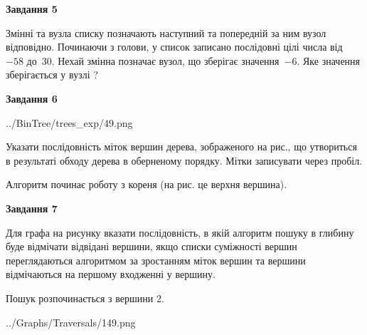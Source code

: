 \documentclass[12pt, ukrainian]{article}
\begin{document}
{\begin {large}
{\begin {center}\textbf{Завдання 5}\end {center}}\par
Змінні  та  вузла списку позначають наступний та попередній за ним вузол відповідно. Починаючи з голови, у список записано послідовні цілі числа від~$-58$ до~$30$. Нехай змінна  позначає вузол, що зберігає значення~$-6$.
Яке значення зберігається у вузлі  ?\par
\newpage

{\begin {center}\textbf{Завдання 6}\end {center}}\par

\begin{center}
	{../BinTree/trees_exp/49.png}
\end{center}
Указати послідовність міток вершин дерева, зображеного на рис., що утвориться в результаті обходу дерева в оберненому порядку. Мітки записувати через пробіл.\par Алгоритм починає роботу з кореня (на рис. це верхня вершина).\par
\newpage

{\begin {center}\textbf{Завдання 7}\end {center}}\par
Для графа на рисунку вказати послідовність, в якій алгоритм пошуку в глибину буде відмічати відвідані вершини, якщо списки суміжності вершин переглядаються алгоритмом за зростанням міток вершин та вершини відмічаються на першому вход\-женні у вершину.\par
Пошук розпочинається з вершини 2.\par

\begin{center}
	{../Graphs/Traversals/149.png}
\end{center}\par
\newpage


\end{large}}
\end{document}
